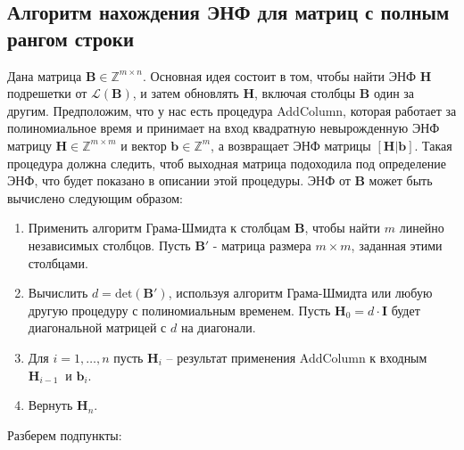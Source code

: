 \subsection{Алгоритм нахождения ЭНФ для матриц с полным рангом строки}

Дана матрица $ \mathbf{B} \in \mathbb{Z}^{m \times n} $. Основная идея состоит в том, чтобы найти ЭНФ $ \mathbf{H} $ подрешетки от $ \mathcal{L}(\mathbf{B}) $, и затем обновлять $ \mathbf{H} $, включая столбцы $ \mathbf{B} $ один за другим. Предположим, что у нас есть процедура AddColumn, которая работает за полиномиальное время и принимает на вход квадратную невырожденную ЭНФ матрицу $ \mathbf{H} \in \mathbb{Z}^{m \times m} $ и вектор $ \mathbf{b} \in \mathbb{Z}^{m}$, а возвращает ЭНФ матрицы $ [\mathbf{H|b}] $. Такая процедура должна следить, чтоб выходная матрица подоходила под определение ЭНФ, что будет показано в описании этой процедуры. ЭНФ от $ \mathbf{B} $ может быть вычислено следующим образом:
\begin{enumerate}
\item Применить алгоритм Грама-Шмидта к столбцам $ \mathbf{B} $, чтобы найти $ m $ линейно независимых столбцов. Пусть $ \mathbf{B}' $ - матрица размера $ m \times m $, заданная этими столбцами.
\item Вычислить $ d=\mathrm{det}(\mathbf{B}') $, используя алгоритм Грама-Шмидта или любую другую процедуру с полиномиальным временем. Пусть $ \mathbf{H}_0=d \cdot \mathbf{I} $ будет диагональной матрицей с $ d $ на диагонали.
\item Для $ i=1, \ldots ,n $ пусть $ \mathbf{H}_i $ -- результат применения AddColumn к входным $  \mathbf{H}_{i-1}\ $ и $ \mathbf{b}_i $.
\item Вернуть $ \mathbf{H}_n $.
\end{enumerate}

Разберем подпункты:

